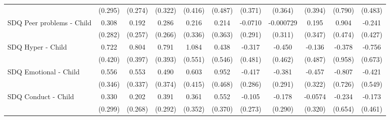 {\begin{tabular}{l*{10}{c}}
            &     (0.295)         &     (0.274)         &     (0.322)         &     (0.416)         &     (0.487)         &     (0.371)         &     (0.364)         &     (0.394)         &     (0.790)         &     (0.483)         \\
\addlinespace
SDQ Peer problems - Child&       0.308         &       0.192         &       0.286         &       0.216         &       0.214         &     -0.0710         &   -0.000729         &       0.195         &       0.904         &      -0.241         \\
            &     (0.282)         &     (0.257)         &     (0.266)         &     (0.336)         &     (0.363)         &     (0.291)         &     (0.311)         &     (0.347)         &     (0.474)         &     (0.427)         \\
\addlinespace
SDQ Hyper - Child&       0.722         &       0.804\sym{*}  &       0.791\sym{*}  &       1.084\sym{*}  &       0.438         &      -0.317         &      -0.450         &      -0.136         &      -0.378         &      -0.756         \\
            &     (0.420)         &     (0.397)         &     (0.393)         &     (0.551)         &     (0.546)         &     (0.481)         &     (0.462)         &     (0.487)         &     (0.958)         &     (0.673)         \\
\addlinespace
SDQ Emotional - Child&       0.556         &       0.553         &       0.490         &       0.603         &       0.952\sym{*}  &      -0.417         &      -0.381         &      -0.457         &      -0.807         &      -0.421         \\
            &     (0.346)         &     (0.337)         &     (0.374)         &     (0.415)         &     (0.468)         &     (0.286)         &     (0.291)         &     (0.322)         &     (0.726)         &     (0.549)         \\
\addlinespace
SDQ Conduct - Child&       0.330         &       0.202         &       0.391         &       0.361         &       0.552         &      -0.105         &      -0.178         &     -0.0574         &      -0.234         &      -0.173         \\
            &     (0.299)         &     (0.268)         &     (0.292)         &     (0.352)         &     (0.370)         &     (0.273)         &     (0.290)         &     (0.320)         &     (0.654)         &     (0.461)         \\
\bottomrule
\end{tabular}
}
